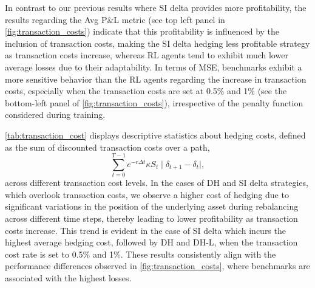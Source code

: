 \documentclass[12pt]{article}
\begin{document}
In contrast to our previous results where SI delta provides more profitability, the results regarding the Avg P\&L metric (see top left panel in \autoref{fig:transaction_costs}) indicate that this profitability is influenced by the inclusion of transaction costs, making the SI delta hedging less profitable strategy as transaction costs increase, whereas RL agents tend to exhibit much lower average losses due to their adaptability. In terms of MSE, benchmarks exhibit a more sensitive behavior than the RL agents regarding the increase in transaction costs, especially when the transaction costs are set at 0.5\% and 1\% (see the bottom-left panel of \autoref{fig:transaction_costs}), irrespective of the penalty function considered during training.

\autoref{tab:transaction_cost} displays descriptive statistics about hedging costs, defined as the sum of discounted transaction costs over a path,
\begin{equation}
    \sum_{t=0}^{T-1}e^{-r\Delta t}\kappa S_{t}\mid \delta_{t+1} - \delta_{t} \mid,
\end{equation}
across different transaction cost levels. In the cases of DH and SI delta strategies, which overlook transaction costs, we observe a higher cost of hedging due to significant variations in the position of the underlying asset during rebalancing across different time steps, thereby leading to lower profitability as transaction costs increase. This trend is evident in the case of SI delta which incurs the highest average hedging cost, followed by DH and DH-L, when the transaction cost rate is set to 0.5\% and 1\%. These results consistently align with the performance differences observed in \autoref{fig:transaction_costs},  where benchmarks are associated with the highest losses.
\end{document}
